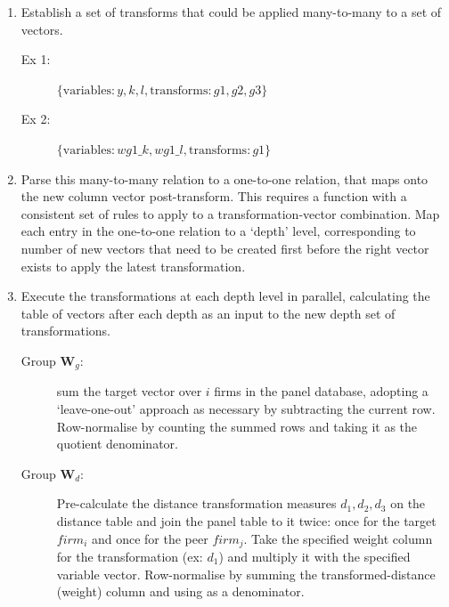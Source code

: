 \begin{enumerate}

    \item Establish a set of transforms that could be applied many-to-many to a set of vectors.
    \begin{description}
        \item[Ex 1:] $\{ \text{variables}: y,k,l, \text{transforms}: g1, g2, g3 \}$
        \item[Ex 2:] $\{ \text{variables}: wg1\_k, wg1\_l, \text{transforms}: g1 \}$
    \end{description}

    \item Parse this many-to-many relation to a one-to-one relation,
            that maps onto the new column vector post-transform.
            This requires a function with a consistent set of rules to apply
            to a transformation-vector combination. Map each entry in the one-to-one relation
            to a `depth' level, corresponding to number of new vectors
            that need to be created first before the right vector exists
            to apply the latest transformation.

    \item Execute the transformations at each depth level in parallel,
            calculating the table of vectors after each depth
            as an input to the new depth set of transformations.
    \begin{description}
        \item[Group $\mathbf W_g$:] sum the target vector over $i$ firms in the panel database,
            adopting a `leave-one-out' approach as necessary by subtracting the current row.
            Row-normalise by counting the summed rows and taking it as the quotient denominator.
        \item[Group $\mathbf W_d$:] Pre-calculate the distance transformation measures $d_1, d_2, d_3$
            on the distance table and join the panel table to it twice:
            once for the target $firm_i$ and once for the peer $firm_j$.
            Take the specified weight column for the transformation (ex: $d_1$)
            and multiply it with the specified variable vector.
            Row-normalise by summing the transformed-distance (weight) column and using as a denominator.
    \end{description}
\end{enumerate}

